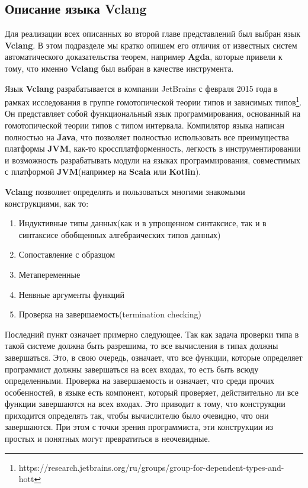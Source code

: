 \subsection{Описание языка Vclang}

Для реализации всех описанных во второй главе представлений был выбран язык \textbf{Vclang}. В этом подразделе мы кратко опишем его отличия от известных систем автоматического доказательства теорем, например \textbf{Agda}, которые привели к тому, что именно \textbf{Vclang} был выбран в качестве инструмента.

Язык \textbf{Vclang} разрабатывается в компании JetBrains с февраля 2015 года в рамках исследования в группе гомотопической теории типов и зависимых типов\footnote{https://research.jetbrains.org/ru/groups/group-for-dependent-types-and-hott}. Он представляет собой функциональный язык программирования, основанный на гомотопической теории типов с типом интервала. Компилятор языка написан полностью на \textbf{Java}, что позволяет полностью использовать все преимущества платформы \textbf{JVM}, как-то кроссплатформенность, легкость в инструментировании и возможность разрабатывать модули на языках программирования, совместимых с платформой \textbf{JVM}(например на \textbf{Scala} или \textbf{Kotlin}).

\textbf{Vclang} позволяет определять и пользоваться многими знакомыми конструкциями, как то:
\begin{enumerate}
  \item Индуктивные типы данных(как и в упрощенном синтаксисе, так и в синтаксисе обобщенных алгебраических типов данных)
  \item Сопоставление с образцом
  \item Метапеременные
  \item Неявные аргументы функций
  \item Проверка на завершаемость(termination checking)
\end{enumerate}

Последний пункт означает примерно следующее. Так как задача проверки типа в такой системе должна быть разрешима, то все вычисления в типах должны завершаться. Это, в свою очередь, означает, что все функции, которые определяет программист должны завершаться на всех входах, то есть быть всюду определенными. Проверка на завершаемость и означает, что среди прочих особенностей, в языке есть компонент, который проверяет, действительно ли все функции завершаются на всех входах. Это приводит к тому, что конструкции приходится определять так, чтобы вычислителю было очевидно, что они завершаются. При этом с точки зрения программиста, эти конструкции из простых и понятных могут превратиться в неочевидные.

